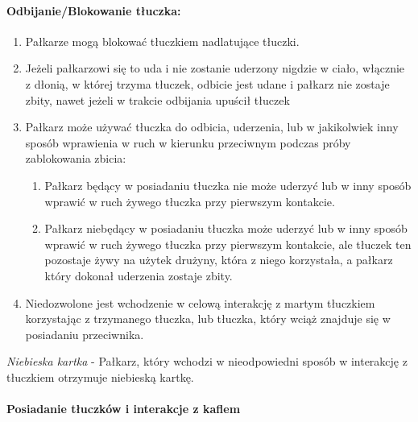 \documentclass[12pt]{article}
\begin{document}
\paragraph{Odbijanie/Blokowanie tłuczka:}

\begin{enumerate}
	\item
	      Pałkarze mogą blokować tłuczkiem nadlatujące tłuczki.
	\item
	      Jeżeli pałkarzowi się to uda i nie zostanie uderzony nigdzie w ciało,
	      włącznie z dłonią, w której trzyma tłuczek, odbicie jest udane i
	      pałkarz nie zostaje zbity, nawet jeżeli w trakcie odbijania upuścił
	      tłuczek
	\item
	      Pałkarz może używać tłuczka do odbicia, uderzenia, lub w jakikolwiek
	      inny sposób wprawienia w ruch w kierunku przeciwnym podczas próby
	      zablokowania zbicia:

	      \begin{enumerate}
		      \item
		            Pałkarz będący w posiadaniu tłuczka nie może uderzyć lub w inny
		            sposób wprawić w ruch żywego tłuczka przy pierwszym kontakcie.
		      \item
		            Pałkarz niebędący w posiadaniu tłuczka może uderzyć lub w inny
		            sposób wprawić w ruch żywego tłuczka przy pierwszym kontakcie, ale
		            tłuczek ten pozostaje żywy na użytek drużyny, która z niego
		            korzystała, a pałkarz który dokonał uderzenia zostaje zbity.
	      \end{enumerate}
	\item
	      Niedozwolone jest wchodzenie w celową interakcję z martym tłuczkiem
	      korzystając z trzymanego tłuczka, lub tłuczka, który wciąż znajduje
	      się w posiadaniu przeciwnika.
\end{enumerate}

\emph{Niebieska kartka} - Pałkarz, który wchodzi w nieodpowiedni sposób
w interakcję z tłuczkiem otrzymuje niebieską kartkę.

\paragraph{Posiadanie tłuczków i interakcje z kaflem}
\end{document}
